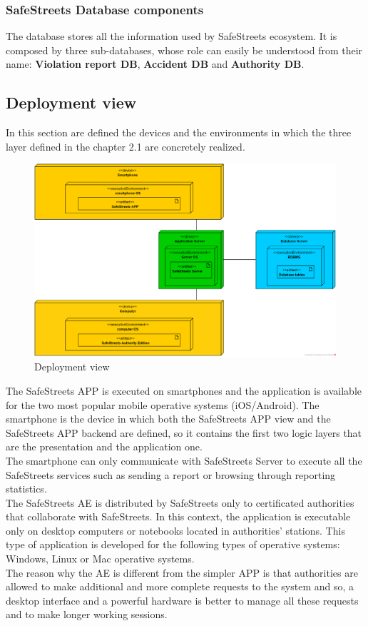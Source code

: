 \documentclass{article}
\begin{document}
		\subsubsection{SafeStreets Database components}
		The database stores all the information used by SafeStreets ecosystem. It is composed by three sub-databases, whose role can easily be understood from their name: \textbf{Violation report DB}, \textbf{Accident DB} and \textbf{Authority DB}.
		
		\subsection{Deployment view}
		In this section are defined the devices and the environments in which the three layer defined in the chapter 2.1 are concretely realized.
			\begin{figure}[H]
			\includegraphics [scale=0.5] {diagrams/deployment_view.png}
			\caption[Deployment View]{Deployment view}
			\label{fig:deployment_view}
		\end{figure}
   		The SafeStreets APP is executed on smartphones and the application is available for the two most popular mobile operative systems (iOS/Android).
   		The smartphone is the device in which both the SafeStreets APP view and the SafeStreets APP backend are defined, so it contains the first two logic layers that are the presentation and the application one.\\ The smartphone can only communicate with SafeStreets Server to execute all the SafeStreets services such as sending a report or browsing through reporting statistics.\\
   		The SafeStreets AE is distributed by SafeStreets only to certificated authorities that collaborate with SafeStreets. In this context, the application is executable only on desktop computers or notebooks located in authorities' stations. This type of application is developed for the following types of operative systems: Windows, Linux or Mac operative systems.\\ The reason why the AE is different from the simpler APP is that authorities are allowed to make additional and more complete requests to the system and so, a desktop interface and a powerful hardware is better to manage all these requests and to make longer working sessions.\\\\
\end{document}
